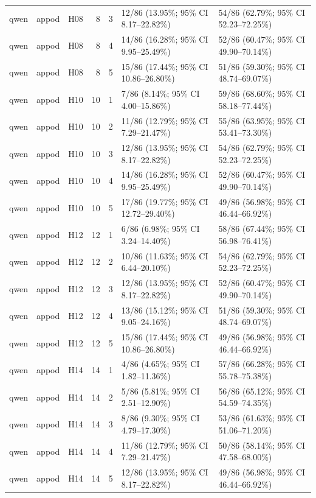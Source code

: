 \begin{longtable}{lllrrll}
qwen & appod & H08 & 8 & 3 & 12/86 (13.95\%; 95\% CI 8.17–22.82\%) & 54/86 (62.79\%; 95\% CI 52.23–72.25\%) \\
qwen & appod & H08 & 8 & 4 & 14/86 (16.28\%; 95\% CI 9.95–25.49\%) & 52/86 (60.47\%; 95\% CI 49.90–70.14\%) \\
qwen & appod & H08 & 8 & 5 & 15/86 (17.44\%; 95\% CI 10.86–26.80\%) & 51/86 (59.30\%; 95\% CI 48.74–69.07\%) \\
qwen & appod & H10 & 10 & 1 & 7/86 (8.14\%; 95\% CI 4.00–15.86\%) & 59/86 (68.60\%; 95\% CI 58.18–77.44\%) \\
qwen & appod & H10 & 10 & 2 & 11/86 (12.79\%; 95\% CI 7.29–21.47\%) & 55/86 (63.95\%; 95\% CI 53.41–73.30\%) \\
qwen & appod & H10 & 10 & 3 & 12/86 (13.95\%; 95\% CI 8.17–22.82\%) & 54/86 (62.79\%; 95\% CI 52.23–72.25\%) \\
qwen & appod & H10 & 10 & 4 & 14/86 (16.28\%; 95\% CI 9.95–25.49\%) & 52/86 (60.47\%; 95\% CI 49.90–70.14\%) \\
qwen & appod & H10 & 10 & 5 & 17/86 (19.77\%; 95\% CI 12.72–29.40\%) & 49/86 (56.98\%; 95\% CI 46.44–66.92\%) \\
qwen & appod & H12 & 12 & 1 & 6/86 (6.98\%; 95\% CI 3.24–14.40\%) & 58/86 (67.44\%; 95\% CI 56.98–76.41\%) \\
qwen & appod & H12 & 12 & 2 & 10/86 (11.63\%; 95\% CI 6.44–20.10\%) & 54/86 (62.79\%; 95\% CI 52.23–72.25\%) \\
qwen & appod & H12 & 12 & 3 & 12/86 (13.95\%; 95\% CI 8.17–22.82\%) & 52/86 (60.47\%; 95\% CI 49.90–70.14\%) \\
qwen & appod & H12 & 12 & 4 & 13/86 (15.12\%; 95\% CI 9.05–24.16\%) & 51/86 (59.30\%; 95\% CI 48.74–69.07\%) \\
qwen & appod & H12 & 12 & 5 & 15/86 (17.44\%; 95\% CI 10.86–26.80\%) & 49/86 (56.98\%; 95\% CI 46.44–66.92\%) \\
qwen & appod & H14 & 14 & 1 & 4/86 (4.65\%; 95\% CI 1.82–11.36\%) & 57/86 (66.28\%; 95\% CI 55.78–75.38\%) \\
qwen & appod & H14 & 14 & 2 & 5/86 (5.81\%; 95\% CI 2.51–12.90\%) & 56/86 (65.12\%; 95\% CI 54.59–74.35\%) \\
qwen & appod & H14 & 14 & 3 & 8/86 (9.30\%; 95\% CI 4.79–17.30\%) & 53/86 (61.63\%; 95\% CI 51.06–71.20\%) \\
qwen & appod & H14 & 14 & 4 & 11/86 (12.79\%; 95\% CI 7.29–21.47\%) & 50/86 (58.14\%; 95\% CI 47.58–68.00\%) \\
qwen & appod & H14 & 14 & 5 & 12/86 (13.95\%; 95\% CI 8.17–22.82\%) & 49/86 (56.98\%; 95\% CI 46.44–66.92\%) \\

\end{longtable}
